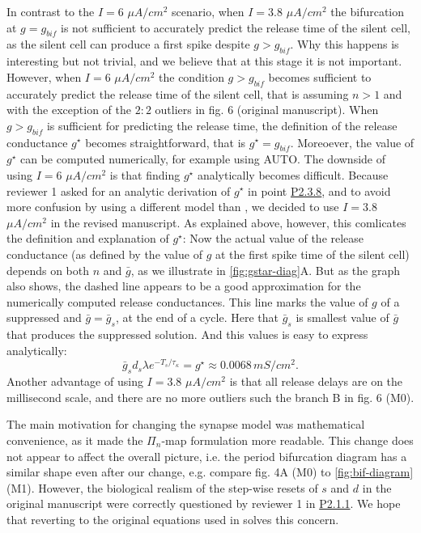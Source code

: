 \documentclass[utf8]{article}
\newcounter{point}[section]
\begin{document}
In contrast to the $I=6$ $\si{\mu A/cm^2}$ scenario, when $I=3.8$ $\si{\mu A/cm^2}$ the bifurcation at $g=g_{bif}$ is not sufficient to accurately predict the release time of the silent cell, as the silent cell can produce a first spike despite $g > g_{bif}$.
Why this happens is interesting but not trivial, and we believe that at this stage it is not important.
However, when $I=6$ $\si{\mu A/cm^2}$ the condition $g>g_{bif}$ becomes sufficient to accurately predict the release time of the silent cell, that is assuming $n>1$ and with the exception of the $2:2$ outliers in fig. 6 (original manuscript).
When $g>g_{bif}$ is sufficient for predicting the release time, the definition of the release conductance $g^\star$ becomes straightforward, that is $g^\star=g_{bif}$.
Moreoever, the value of $g^\star$ can be computed numerically, for example using AUTO.
The downside of using $I=6$ $\si{\mu A/cm^2}$ is that finding $g^\star$ analytically becomes difficult.
Because reviewer 1 asked for an analytic derivation of $g^\star$ in point \hyperref[p:gstar]{P2.3.8}, and to avoid more confusion by using a different model than \cite{bose2011}, we decided to use $I=3.8$ $\si{\mu A/cm^2}$ in the revised manuscript.
As explained above, however, this comlicates the definition and explanation of $g^\star$:
Now the actual value of the release conductance (as defined by the value of $g$ at the first spike time of the silent cell) depends on both $n$ and $\bar g$, as we illustrate in \cref{fig:gstar-diag}A.
But as the graph also shows, the dashed line appears to be a good approximation for the numerically computed release conductances.
This line marks the value of $g$ of a suppressed and $\bar g= \bar g_s$, at the end of a cycle.
Here that $\bar g_s$ is smallest value of $\bar g$ that produces the suppressed solution.
And this values is easy to express analytically:
\begin{equation}
	\bar g_s d_s\lambda e^{-T_{s}/\tau_\kappa}=g^{\star} \approx 0.0068\, \si{mS/cm^2}.
\end{equation}
Another advantage of using $I=3.8$ $\si{\mu A/cm^2}$ is that all release delays are on the millisecond scale, and there are no more outliers such the branch B in fig. 6 (M0).

The main motivation for changing the synapse model was mathematical convenience, as it made the $\Pi_{n}$-map formulation more readable.
This change does not appear to affect the overall picture, i.e. the period bifurcation diagram has a similar shape even after our change, e.g. compare fig. 4A (M0) to \cref{fig:bif-diagram} (M1).
However, the biological realism of the step-wise resets of $s$ and $d$ in the original manuscript were correctly questioned by reviewer 1 in \hyperref[p:biol]{P2.1.1}.
We hope that reverting to the original equations used in \cite{bose2011} solves this concern.
\end{document}
